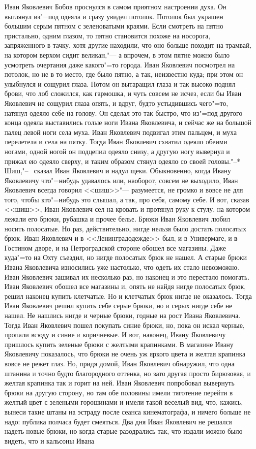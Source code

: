 Иван Яковлевич Бобов проснулся в самом приятном настроении духа. Он выглянул из"=под одеяла и сразу увидел потолок. Потолок был украшен большим серым пятном с зеленоватыми краями. Если смотреть на пятно пристально, одним глазом, то пятно становится похоже на носорога, запряженного в тачку, хотя другие находили, что оно больше походит на трамвай, на котором верхом сидит великан,"---  а впрочем, в этом пятне можно было усмотреть очертания даже какого"=то города. Иван Яковлевич посмотрел на потолок, но не в то место, где было пятно, а так, неизвестно куда; при этом он улыбнулся и сощурил глаза. Потом он вытаращил глаза и так высоко поднял брови, что лоб сложился, как гармошка, и чуть совсем не исчез, если бы Иван Яковлевич не сощурил глаза опять, и вдруг, будто устыдившись чего"=то, натянул одеяло себе на голову. Он сделал это так быстро, что из"=под другого конца одеяла выставились голые ноги Ивана Яковлевича, и сейчас же на большой палец левой ноги села муха. Иван Яковлевич подвигал этим пальцем, и муха перелетела и села на пятку. Тогда Иван Яковлевич схватил одеяло обеими ногами, одной ногой он подцепил одеяло снизу, а другую ногу вывернул и прижал ею одеяло сверху, и таким образом стянул одеяло со своей головы."--*  Шиш,"--~ сказал Иван Яковлевич и надул щеки. Обыкновенно, когда Ивану Яковлевичу что"=нибудь удавалось или, наоборот, совсем не выходило, Иван Яковлевич всегда говорил <<шиш>>"--- разумеется, не громко и вовсе не для того, чтобы кто"=нибудь это слышал, а так, про себя, самому себе. И вот, сказав <<шиш>>, Иван Яковлевич сел на кровать и протянул руку к стулу, на котором лежали его брюки, рубашка и прочее белье. Брюки Иван Яковлевич любил носить полосатые. Но раз, действительно, нигде нельзя было достать полосатых брюк. Иван Яковлевич и в <<Ленинградодежде>> был, и в Универмаге, и в Гостином дворе, и на Петроградской стороне обошел все магазины. Даже куда"=то на Охту съездил, но нигде полосатых брюк не нашел. А старые брюки Ивана Яковлевича износились уже настолько, что одеть их стало невозможно. Иван Яковлевич зашивал их несколько раз, но наконец и это перестало помогать. Иван Яковлевич обошел все магазины и, опять не найдя нигде полосатых брюк, решил наконец купить клетчатые. Но и клетчатых брюк нигде не оказалось. Тогда Иван Яковлевич решил купить себе серые брюки, но и серых нигде себе не нашел. Не нашлись нигде и черные брюки, годные на рост Ивана Яковлевича. Тогда Иван Яковлевич пошел покупать синие брюки, но, пока он искал черные, пропали всюду и синие и коричневые. И вот, наконец, Ивану Яковлевичу пришлось купить зеленые брюки с желтыми крапинками. В магазине Ивану Яковлевичу показалось, что брюки не очень уж яркого цвета и желтая крапинка вовсе не режет глаз. Но, придя домой, Иван Яковлевич обнаружил, что одна штанина и точно будто благородного оттенка, но зато другая просто бирюзовая, и желтая крапинка так и горит на ней. Иван Яковлевич попробовал вывернуть брюки на другую сторону, но там обе половины имели тяготение перейти в желтый цвет с зелеными горошинами и имели такой веселый вид, что, кажись, вынеси такие штаны на эстраду после сеанса кинематографа, и ничего больше не надо: публика полчаса будет смеяться. Два дня Иван Яковлевич не решался надеть новые брюки, но когда старые разодрались так, что издали можно было видеть, что и кальсоны Ивана 